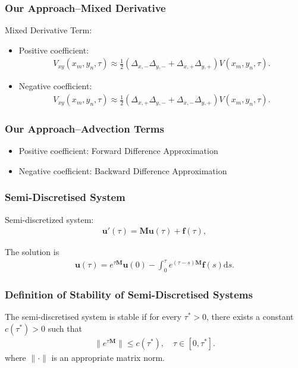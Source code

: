 \documentclass{beamer}
\newcommand{\bit}{\begin{itemize}}
\newcommand{\eit}{\end{itemize}}
\newcommand{\bbb}{\begin{eqnarray}}
\newcommand{\eee}{\end{eqnarray}}
\newcommand{\bbbb}{\begin{eqnarray*}}
\newcommand{\eeee}{\end{eqnarray*}}
\begin{document}

\begin{frame}
\frametitle{Our Approach--Mixed Derivative}
Mixed Derivative Term:
\bit
\item Positive coefficient: 
\bbbb
V_{xy}(x_m,y_n,\tau) \approx \frac{1}{2}(\Delta _{x,-}\Delta_{y,-}+\Delta_{x,+}\Delta_{y,+}) V(x_m,y_n,\tau).
\eeee

\pause

\item Negative coefficient:
\bbbb
V_{xy}(x_m,y_n,\tau) \approx \frac{1}{2}(\Delta _{x,+}\Delta_{y,-}+\Delta_{x,-}\Delta_{y,+}) V(x_m,y_n,\tau).
\eeee
\eit

\end{frame}


\begin{frame}
\frametitle{Our Approach--Advection Terms}
\bit
\item Positive coefficient: Forward Difference Approximation
\vspace{2mm}
\item Negative coefficient: Backward Difference Approximation
\eit
\end{frame}


\begin{frame}
\frametitle{Semi-Discretised System}
Semi-discretized system:
\bbbb
\label{semi}
\textbf{u}'(\tau) = \textbf{M}\textbf{u}(\tau)+\textbf{f}(\tau),
\eeee

The solution is 
\bbbb
\mathbf{u}(\tau) = e^{\tau \mathbf{M}}\mathbf{u}(0)-\int_0^{\tau} e^{(\tau -s)\textbf{M}}\textbf{f}(s)\text{d}s.
\eeee

\end{frame}


\begin{frame}
\frametitle{Definition of Stability of Semi-Discretised Systems}

\begin{definition}
The semi-discretised system is stable if for every $\tau^*>0$, there exists a constant $c(\tau^*)>0$ such that
\bbb
\|e^{\tau \mathbf{M}}\| \leq c(\tau^*),\quad \tau\in[0,\tau^*].
\eee
where $\|\cdot\|$ is an appropriate matrix norm.

\end{definition}


\end{frame}
\end{document}
